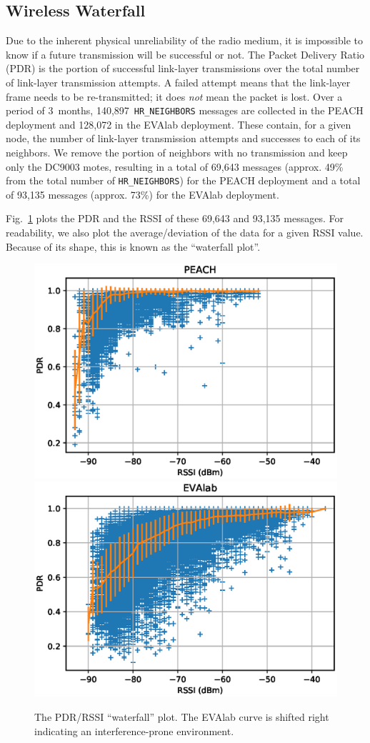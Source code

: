 \documentclass{elsarticle}
\newcommand{\HRNEIGHBORS}         {{\tt HR\_NEIGHBORS}\xspace}
\newcommand{\PEACHNUMHRNEIGHBORS} {140,897\xspace}
\newcommand{\EVANUMHRNEIGHBORS}   {128,072\xspace}
\begin{document}
\subsection{Wireless Waterfall}
\label{sec:waterfall}


Due to the inherent physical unreliability of the radio medium, it is impossible to know if a future transmission will be successful or not.
The Packet Delivery Ratio (PDR) is the portion of successful link-layer transmissions over the total number of link-layer transmission attempts.
A failed attempt means that the link-layer frame needs to be re-transmitted; it does \textit{not} mean the packet is lost.
Over a period of 3~months, \PEACHNUMHRNEIGHBORS~\HRNEIGHBORS messages are collected in the PEACH deployment and \EVANUMHRNEIGHBORS in the EVAlab deployment.
These contain, for a given node, the number of link-layer transmission attempts and successes to each of its neighbors.
We remove the portion of neighbors with no transmission and keep only the DC9003 motes, resulting in a total of 69,643 messages (approx. 49\% from the total number of \HRNEIGHBORS) for the PEACH deployment and a total of 93,135 messages (approx. 73\%) for the EVAlab deployment.


Fig.~\ref{fig:waterfall} plots the PDR and the RSSI of these 69,643 and 93,135 messages.
For readability, we also plot the average/deviation of the data for a given RSSI value.
Because of its shape, this is known as the ``waterfall plot''.

\begin{figure}
    \includegraphics[width=0.5\columnwidth]{waterfall_peach.eps}
    \includegraphics[width=0.5\columnwidth]{waterfall.eps}
    \caption{
        The PDR/RSSI ``waterfall'' plot. The EVAlab curve is shifted right indicating an interference-prone environment.
    }
    \label{fig:waterfall}
\end{figure}
\end{document}
